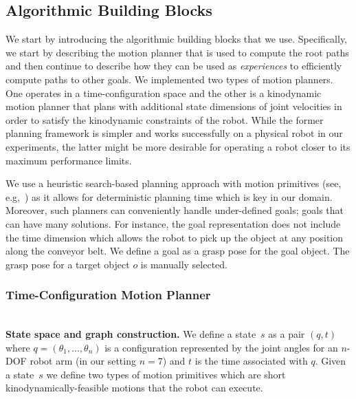 \documentclass[a4paper]{report}
\begin{document}
\subsection{Algorithmic Building Blocks}
\label{subsec:alg_building_blocks}
We start by introducing the algorithmic building blocks that we use.
Specifically, we start by describing the motion planner \calP that is used to compute the root paths 
and then continue to describe how they can be used as \emph{experiences} to efficiently compute paths to other goals.
We implemented two types of motion planners. One operates in a time-configuration space and the other is a kinodynamic motion planner that plans with additional state dimensions of joint velocities in order to satisfy the kinodynamic constraints of the robot. While the former planning framework is simpler and works successfully on a physical robot in our experiments, the latter might be more desirable for operating a robot closer to its maximum performance limits.

We use a heuristic search-based planning approach with motion primitives (see, e.g,~\cite{CCL10,CSCL11,LF09})
as it allows for deterministic planning time which is key in our domain.
Moreover, such planners can conveniently handle under-defined goals; goals that can have many solutions.
For instance, the goal representation does not include the time dimension which allows the robot to pick up the object at any position along the conveyor belt. 
We define a goal as a grasp pose for the goal object. The grasp pose for a target object $o$ is manually selected.
\subsubsection{Time-Configuration Motion Planner}
\hfill\\
\textbf{State space and graph construction.}
We define a state~$s$ as a pair $(q,t)$ where $q = (\theta_1, ..., \theta_n)$ is a configuration represented by the joint angles for an $n$-DOF robot arm (in our setting $n=$7) and $t$ is the time associated with $q$.
%
Given a state~$s$ we define two types of motion primitives which are short kinodynamically-feasible motions that the robot can execute.
%
\end{document}
